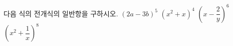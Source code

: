 다음 식의 전개식의 일반항을 구하시오.
 $(2a-3b)^5$
 $(x^2+x)^4$
 $\left(x-\dfrac{2}{y}\right)^6$
 $\left(x^2+\dfrac{1}{x}\right)^8$
